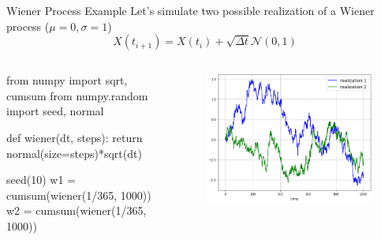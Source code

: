\documentclass{beamer}
\begin{document}
\begin{frame}[fragile]{Wiener Process Example}
Let's simulate two possible realization of a Wiener process ($\mu = 0, \sigma=1$)
\begin{equation*}
X(t_{i+1}) = X(t_i) + \sqrt{\Delta t}\mathcal{N}(0,1)
\end{equation*}
\begin{columns}
\begin{ipython}
from numpy import sqrt, cumsum
from numpy.random import seed, normal

def wiener(dt, steps):
    return normal(size=steps)*sqrt(dt)

seed(10)
w1 = cumsum(wiener(1/365, 1000))
w2 = cumsum(wiener(1/365, 1000))
		\end{ipython}
		\begin{figure}[h]
			\begin{center}
				\includegraphics[width=0.90\linewidth]{wiener}
			\end{center}
		\end{figure}
	\end{columns}
\end{frame}
\end{document}

